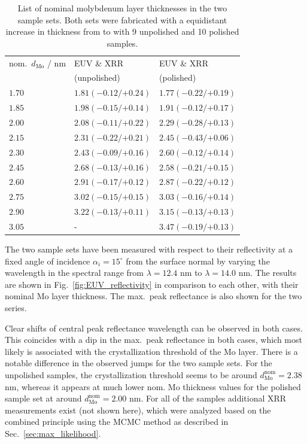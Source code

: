 \begin{table}[htbp]
\centering
\caption{List of nominal molybdenum layer thicknesses in the two sample sets. Both sets were fabricated with a equidistant increase in thickness from  to  with 9 unpolished and 10 polished samples.}
\label{ch_spec:tbl_mo_si_thickness_mcmc_result}
\begin{tabular}{@{}lll@{}}
\toprule
nom.~$d_\text{Mo}$ / nm & EUV \& XRR &EUV \& XRR\\ 
&(unpolished) & (polished) \\
\midrule
$1.70$ &$1.81({-0.12}/{+0.24})$  &$1.77({-0.22}/{+0.19})$ \\
$1.85$ &$1.98({-0.15}/{+0.14})$  &$1.91({-0.12}/{+0.17})$ \\
$2.00$ &$2.08({-0.11}/{+0.22})$  &$2.29({-0.28}/{+0.13})$ \\
$2.15$ &$2.31({-0.22}/{+0.21})$  &$2.45({-0.43}/{+0.06})$ \\
$2.30$ &$2.43({-0.09}/{+0.16})$   &$2.60({-0.12}/{+0.14})$ \\
$2.45$ &$2.68({-0.13}/{+0.16})$  &$2.58({-0.21}/{+0.15})$ \\
$2.60$ &$2.91({-0.17}/{+0.12})$ &$2.87({-0.22}/{+0.12})$ \\
$2.75$ &$3.02({-0.15}/{+0.15})$  &$3.03({-0.16}/{+0.14})$ \\
$2.90$ &$3.22({-0.13}/{+0.11})$ &$3.15({-0.13}/{+0.13})$ \\
$3.05$ &-  & $3.47({-0.19}/{+0.13})$ \\
 \bottomrule
\end{tabular}
\end{table}

The two sample sets have been measured with respect to their reflectivity at a fixed angle of incidence $\alpha_i=15^\circ$ from the surface normal by varying the wavelength in the spectral range from $\lambda=12.4$ nm to $\lambda=14.0$ nm. The results are shown in Fig.~\ref{fig:EUV_reflectivity} in comparison to each other, with their nominal Mo layer thickness. The max.~peak reflectance is also shown for the two series.

Clear shifts of central peak reflectance wavelength can be observed in both cases. This coincides with a dip in the max.~peak reflectance in both cases, which most likely is associated with the crystallization threshold of the Mo layer. There is a notable difference in the observed jumps for the two sample sets. For the unpolished samples, the crystallization threshold seems to be around $d^\text{nom}_\text{Mo} =2.38$ nm, whereas it appears at much lower nom. Mo thickness values for the polished sample set at around  $d^\text{nom}_\text{Mo} =2.00$ nm. For all of the samples additional XRR measurements exist (not shown here), which were analyzed based on the combined principle using the MCMC method as described in Sec.~\ref{sec:max_likelihood}. 

